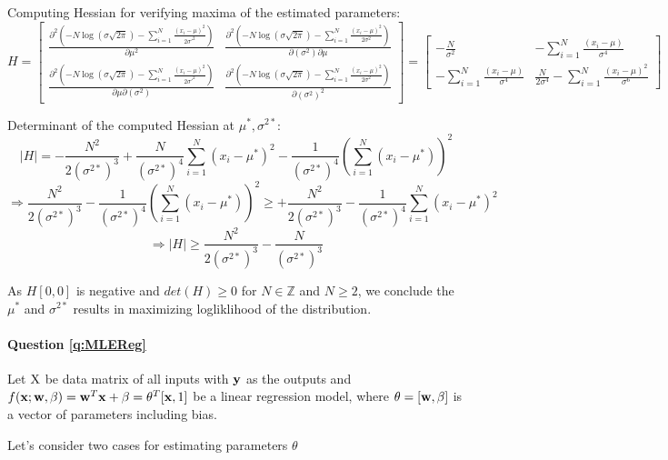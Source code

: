     Computing Hessian for verifying maxima of the estimated parameters:
    $$H = \begin{bmatrix} 
            \frac{\partial^2 (-N \log (\sigma \sqrt{2\pi}) - \sum_{i=1}^N \frac{(x_i - \mu)^2}{2\sigma'^2})}{\partial \mu^2} & 
            \frac{\partial^2 (-N \log (\sigma \sqrt{2\pi}) - \sum_{i=1}^N \frac{(x_i - \mu)^2}{2\sigma^2})}{\partial (\sigma^2) \partial \mu} \\ 
            \frac{\partial^2 (-N \log (\sigma \sqrt{2\pi}) - \sum_{i=1}^N \frac{(x_i - \mu)^2}{2\sigma'^2})}{\partial \mu \partial (\sigma^2)} & 
            \frac{\partial^2 (-N \log (\sigma \sqrt{2\pi}) - \sum_{i=1}^N \frac{(x_i - \mu)^2}{2\sigma^2})}{\partial (\sigma^2)^2} 
        \end{bmatrix} = 
        \begin{bmatrix} 
            -\frac{N}{\sigma^2} &  
            - \sum_{i=1}^N \frac{(x_i - \mu)}{\sigma^4} \\ 
            - \sum_{i=1}^N \frac{(x_i - \mu) }{\sigma^4} & 
            \frac{N}{2 \sigma^4} - \sum_{i=1}^N \frac{(x_i - \mu)^2}{\sigma^6} 
        \end{bmatrix}$$
    
    Determinant of the computed Hessian at $\mu^*, \sigma^{2*}$:
    $$ |H| = -\frac{N^2}{2 (\sigma^{2*})^3} + \frac{N}{(\sigma^{2*})^4} \sum_{i=1}^N (x_i - \mu^*)^2 - \frac{1}{(\sigma^{2*})^4} (\sum_{i=1}^N(x_i - \mu^*))^2$$
    $$\Rightarrow \frac{N^2}{2 (\sigma^{2*})^3} - \frac{1}{(\sigma^{2*})^4} (\sum_{i=1}^N(x_i - \mu^*))^2 \geq +\frac{N^2}{2 (\sigma^{2*})^3} - \frac{1}{(\sigma^{2*})^4} \sum_{i=1}^N(x_i - \mu^*)^2$$
    $$\Rightarrow |H| \geq \frac{N^2}{2 (\sigma^{2*})^3} - \frac{N}{(\sigma^{2*})^3}$$
    
    As $H[0,0]$ is negative and $det(H) \geq 0$ for $N \in \mathbb{Z}$ and $N \geq 2$, we conclude the $\mu^*$ and $\sigma^{2*}$ results in maximizing logliklihood of the distribution.

    
    

\paragraph{Question \ref{q:MLEReg}}

Let ${\mathrm{{X}}}$ be data matrix of all inputs with $\mathbf{y}$ as the outputs and $f(\mathbf{x}; \mathbf{w}, \beta) = \mathbf{w}^T\mathbf{x} + \beta = \theta^T[\mathbf{x}, 1]$ be a linear regression model, where $\theta=[\mathbf{w}, \beta]$ is a vector of parameters including bias.

Let's consider two cases for estimating parameters $\theta$

